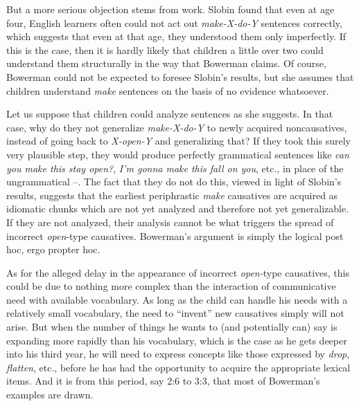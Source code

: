 But a more serious objection stems from  work.
Slobin found that even at age four, English learners often could not act out \textit{make-X-do-Y} sentences correctly, which suggests that even at that age, they understood them only imperfectly. If this is the case, then it is hardly likely that children a little over two could understand them structurally in the way that Bowerman claims. Of course, Bower\-man could not be expected to foresee Slobin's results, but she assumes that children understand \textit{make} sentences on the basis of no evidence whatsoever.

Let us suppose that children could analyze sentences as she suggests. In that case, why do they not generalize \textit{make-X-do-Y} to newly acquired noncausatives, instead of going back to \textit{X-open-Y} and generalizing that? If they took this surely very plausible step, they would produce perfectly grammatical sentences like \textit{can you make this stay open?}, \textit{I'm gonna make this fall on you}, etc., in place of the ungrammatical --. The fact that they do not do this, viewed in light of Slobin's results, suggests that the earliest periphrastic \textit{make} causatives are acquired as idiomatic chunks which are not yet analyzed and therefore not yet generalizable. If they are not analyzed, their analysis cannot be what triggers the spread of incorrect \textit{open}-type causatives. Bowerman's argument is simply the logical post hoc, ergo propter hoc.

As for the alleged delay in the appearance of incorrect \textit{open-}type causatives, this could be due to nothing more complex than the interaction of communicative need with available vocabulary. As long as the child can handle his needs with a relatively small vocabulary, the need to ``invent'' new causatives simply will not arise. But when the number of things he wants to (and potentially can) say is expanding more rapidly than his vocabulary, which is the case as he gets deeper into his third year, he will need to express concepts like those expressed by \textit{drop}, \textit{flatten}, etc., before he has had the opportunity to acquire the appropriate lexical items. And it is from this period, say 2:6 to 3:3, that most of Bowerman's examples are drawn.\\\\

